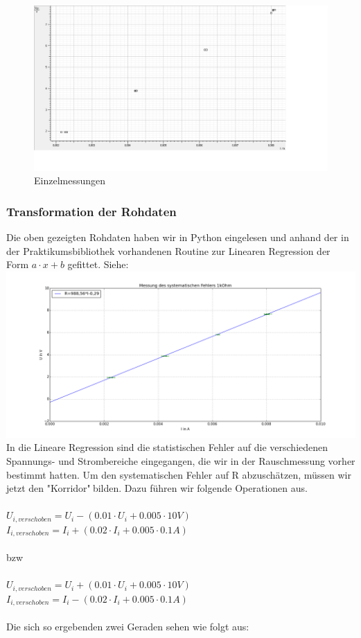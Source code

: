 \documentclass[12pt,a4paper]{article}
\begin{document}
\begin{figure}[H]\centering
\includegraphics[scale=0.35]{raw_U_gegen_I.png}
\caption{Einzelmessungen}
\end{figure}


\subsubsection{Transformation der Rohdaten}
Die oben gezeigten Rohdaten haben wir in Python eingelesen und anhand der in der Praktikumsbibliothek vorhandenen Routine zur Linearen Regression der Form $a\cdot x + b $ gefittet. Siehe:\\
\includegraphics[scale=0.35]{lin_reg_single}
\\ In die Lineare Regression sind die statistischen Fehler auf die verschiedenen Spannungs- und Strombereiche eingegangen, die wir in der Rauschmessung vorher bestimmt hatten. Um den systematischen Fehler auf R abzuschätzen, müssen wir jetzt den "Korridor"$~$bilden. Dazu führen wir folgende Operationen aus.\\
\\$U_{i,verschoben} = U_i - (0.01 \cdot U_i + 0.005 \cdot 10V)$\\
$I_{i,verschoben} = I_i + (0.02 \cdot I_i + 0.005 \cdot 0.1A)$\\
\\bzw\\
\\$U_{i,verschoben} = U_i + (0.01 \cdot U_i + 0.005 \cdot 10V)$\\
$I_{i,verschoben} = I_i - (0.02 \cdot I_i + 0.005 \cdot 0.1A)$\\
\\Die sich so ergebenden zwei Geraden sehen wie folgt aus:\\
\end{document}
